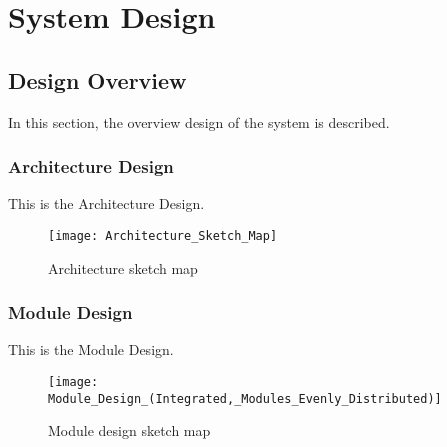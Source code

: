 \chapter{System Design} \label{chap:system-design}

\section{Design Overview}
In this section, the overview design of the system is described.

\subsection{Architecture Design}

This is the Architecture Design.

\begin{figure}[!h]
	\centering
	\texttt{[image: Architecture\_Sketch\_Map]}
	\caption{Architecture sketch map}
	\label{fig:architecture-sketch-map}
\end{figure}

\subsection{Module Design}

This is the Module Design.

\begin{figure}[!htbp]
	\centering
	\texttt{[image: Module\_Design\_(Integrated,\_Modules\_Evenly\_Distributed)]}
	\caption{Module design sketch map}
	\label{fig:module-design}
\end{figure}


